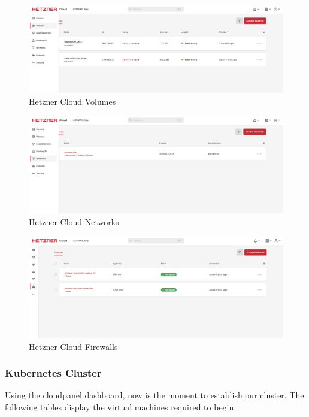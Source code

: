 \begin{figure}[H]
  \centering
  \includegraphics[width=1\textwidth]{src/assets/chapters/volumes.png}
  \caption{Hetzner Cloud Volumes}
  \label{fig:cloud-project-volumes}
\end{figure}

\begin{figure}[H]
  \centering
  \includegraphics[width=1\textwidth]{src/assets/chapters/networks.png}
  \caption{Hetzner Cloud Networks}
  \label{fig:cloud-project-networks}
\end{figure}


\begin{figure}[H]
  \centering
  \includegraphics[width=1\textwidth]{src/assets/chapters/firewall.png}
  \caption{Hetzner Cloud Firewalls}
  \label{fig:cloud-project-fw}
\end{figure}


\subsubsection{Kubernetes Cluster}
Using the cloudpanel dashboard, now is the moment to establish our cluster. The following tables display the virtual machines required to begin.

